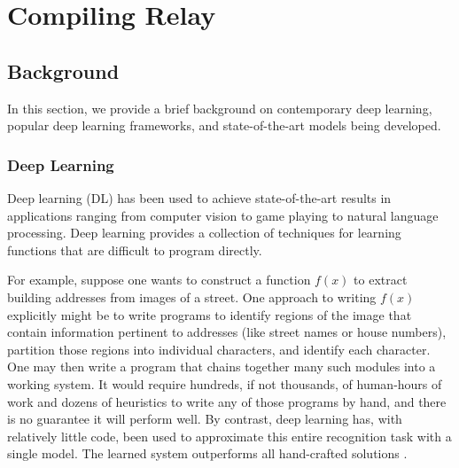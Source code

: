 \chapter{Compiling Relay}
\label{ch:compiler}

\section{Background}
\label{sec:background}


In this section, we provide a brief background on contemporary deep learning,
  popular deep learning frameworks, and state-of-the-art
  models being developed.

\subsection{Deep Learning}

Deep learning (DL) has been used to achieve state-of-the-art results in applications ranging from
computer vision to game playing to natural language processing. Deep learning provides a collection of
techniques for learning functions that are difficult to program directly.

For example, suppose one wants to construct a function $f(x)$ to extract building addresses from
images of a street. One approach to writing $f(x)$ explicitly might be to write programs to identify
regions of the image that contain information pertinent to addresses (like street names or house
numbers), partition those regions into individual characters, and identify each character.
One may then write a program that chains together many such modules into a working system.
It would require hundreds, if not thousands, of human-hours of work and dozens of heuristics to
write any of those programs by hand, and there is no guarantee it will perform well.
By contrast, deep learning has, with relatively little code, been
used to approximate this entire recognition task with a single model. The learned system
outperforms all hand-crafted solutions \cite{streetview}.

